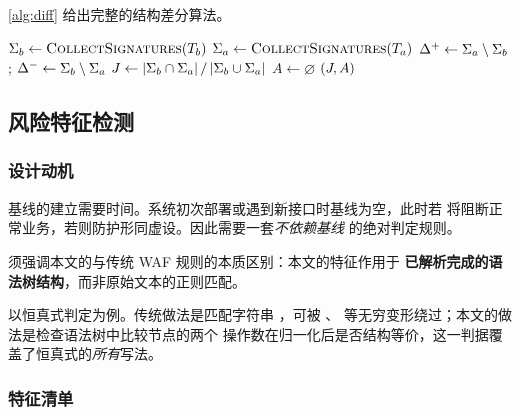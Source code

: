\cref{alg:diff} 给出完整的结构差分算法。

\begin{algorithm}[htbp]
\caption{基于路径签名多重集的结构差分定位}
\label{alg:diff}
\small
{}
\BlankLine
{}
$\Sigma_b \leftarrow \textsc{CollectSignatures}(T_b)$\;
$\Sigma_a \leftarrow \textsc{CollectSignatures}(T_a)$\;
$\Delta^{+} \leftarrow \Sigma_a \setminus \Sigma_b$;\quad
$\Delta^{-} \leftarrow \Sigma_b \setminus \Sigma_a$\;
$J \leftarrow |\Sigma_b \cap \Sigma_a| \,/\, |\Sigma_b \cup \Sigma_a|$\;
$A \leftarrow \varnothing$\;
\Return $(J, A)$\;
\end{algorithm}

\subsection{风险特征检测}
\label{subsec:risk-feature}

\subsubsection{设计动机}

基线的建立需要时间。系统初次部署或遇到新接口时基线为空，此时若
将阻断正常业务，若则防护形同虚设。因此需要一套\emph{不依赖基线}
的绝对判定规则。

\begin{keybox}
须强调本文的与传统 WAF 规则的本质区别：本文的特征作用于
\textbf{已解析完成的语法树结构}，而非原始文本的正则匹配。

以恒真式判定为例。传统做法是匹配字符串 ，可被 、
 等无穷变形绕过；本文的做法是检查语法树中比较节点的两个
操作数在归一化后是否结构等价，这一判据覆盖了恒真式的\emph{所有}写法。
\end{keybox}

\subsubsection{特征清单}

